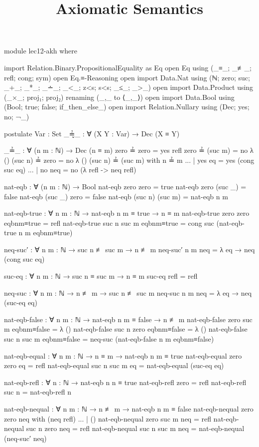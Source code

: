 \documentclass{lecturenotes}
\title{Axiomatic Semantics}
\begin{document}
\maketitle

\begin{code}[hide]
module lec12-akh where

import Relation.Binary.PropositionalEquality as Eq
open Eq using (_≡_; _≢_; refl; cong; sym)
open Eq.≡-Reasoning
open import Data.Nat using (ℕ; zero; suc; _+_; _*_; _∸_; _<_; z<s; s<s; _≤_; _>_)
open import Data.Product using (_×_; proj₁; proj₂) renaming (_,_ to ⟨_,_⟩)
open import Data.Bool using (Bool; true; false; if_then_else_)
open import Relation.Nullary using (Dec; yes; no; ¬_)

postulate
  Var : Set
  _≟̬_ : ∀ (X Y : Var) → Dec (X ≡ Y)

_≟_ : ∀ (n m : ℕ) → Dec (n ≡ m)
zero ≟ zero = yes refl
zero ≟ (suc m) = no λ ()
(suc n) ≟ zero = no λ ()
(suc n) ≟ (suc m) with n ≟ m
... | yes eq  = yes (cong suc eq)
... | no neq = no (λ {refl -> neq refl}) 

nat-eqb : ∀ (n m : ℕ) → Bool
nat-eqb zero zero = true
nat-eqb zero (suc _) = false
nat-eqb (suc _) zero = false
nat-eqb (suc n) (suc m) = nat-eqb n m

nat-eqb-true : ∀ {n m : ℕ} → nat-eqb n m ≡ true → n ≡ m
nat-eqb-true {zero} {zero} eqbnm≡true = refl
nat-eqb-true {suc n} {suc m} eqbnm≡true  = cong suc (nat-eqb-true {n} {m} eqbnm≡true)

neq-suc′ : ∀ {n m : ℕ} → suc n ≢ suc m → n ≢ m
neq-suc′ {n} {m} neq = λ eq → neq (cong suc eq)

suc-eq : ∀ {n m : ℕ} → suc n ≡ suc m → n ≡ m
suc-eq refl = refl

neq-suc : ∀ {n m : ℕ} → n ≢ m → suc n ≢ suc m
neq-suc {n} {m} neq = λ {eq → neq (suc-eq eq)} 

nat-eqb-false : ∀ {n m : ℕ} → nat-eqb n m ≡ false → n ≢ m
nat-eqb-false {zero} {suc m} eqbnm≡false = λ ()
nat-eqb-false {suc n} {zero} eqbnm≡false = λ () 
nat-eqb-false {suc n} {suc m} eqbnm≡false = neq-suc (nat-eqb-false {n} {m} eqbnm≡false)

nat-eqb-equal : ∀ {n m : ℕ} → n ≡ m → nat-eqb n m ≡ true
nat-eqb-equal {zero} {zero} eq = refl
nat-eqb-equal {suc n} {suc m} eq = nat-eqb-equal (suc-eq eq)

nat-eqb-refl : ∀ {n : ℕ} → nat-eqb n n ≡ true
nat-eqb-refl {zero} = refl
nat-eqb-refl {suc n} = nat-eqb-refl {n}

nat-eqb-nequal : ∀ {n m : ℕ} → n ≢ m → nat-eqb n m ≡ false
nat-eqb-nequal {zero} {zero} neq with (neq refl)
... | () 
nat-eqb-nequal {zero} {suc m} neq = refl
nat-eqb-nequal {suc n} {zero} neq = refl
nat-eqb-nequal {suc n} {suc m} neq = nat-eqb-nequal (neq-suc′ neq)


\end{code}
\end{document}
